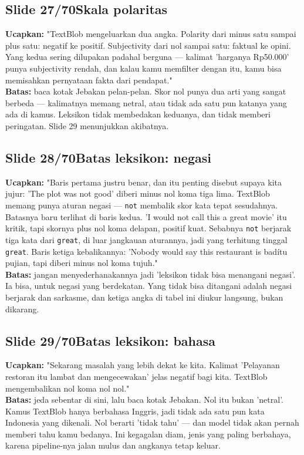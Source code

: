 \documentclass[11pt]{article}
\renewcommand{\framebox}[1]{\colorbox{acc!15}{\textcolor{acc}{\textbf{#1}}}}
\begin{document}
\subsection*{\framebox{Slide 27/70}\quad Skala polaritas}
\textbf{Ucapkan:} "TextBlob mengeluarkan dua angka. Polarity dari minus satu sampai plus satu: negatif ke positif. Subjectivity dari nol sampai satu: faktual ke opini. Yang kedua sering dilupakan padahal berguna — kalimat 'harganya Rp50.000' punya subjectivity rendah, dan kalau kamu memfilter dengan itu, kamu bisa memisahkan pernyataan fakta dari pendapat."\\[2pt]
\textbf{Batas:} baca kotak Jebakan pelan-pelan. Skor nol punya dua arti yang sangat berbeda — kalimatnya memang netral, atau tidak ada satu pun katanya yang ada di kamus. Leksikon tidak membedakan keduanya, dan tidak memberi peringatan. Slide 29 menunjukkan akibatnya.\\[2pt]

\subsection*{\framebox{Slide 28/70}\quad Batas leksikon: negasi}
\textbf{Ucapkan:} "Baris pertama justru benar, dan itu penting disebut supaya kita jujur: 'The plot was not good' diberi minus nol koma tiga lima. TextBlob memang punya aturan negasi — \texttt{not} membalik skor kata tepat sesudahnya. Batasnya baru terlihat di baris kedua. 'I would not call this a great movie' itu kritik, tapi skornya plus nol koma delapan, positif kuat. Sebabnya \texttt{not} berjarak tiga kata dari \texttt{great}, di luar jangkauan aturannya, jadi yang terhitung tinggal \texttt{great}. Baris ketiga kebalikannya: 'Nobody would say this restaurant is bad\' itu pujian, tapi diberi minus nol koma tujuh."\\[2pt]
\textbf{Batas:} jangan menyederhanakannya jadi 'leksikon tidak bisa menangani negasi'. Ia bisa, untuk negasi yang berdekatan. Yang tidak bisa ditangani adalah negasi berjarak dan sarkasme, dan ketiga angka di tabel ini diukur langsung, bukan dikarang.\\[2pt]

\subsection*{\framebox{Slide 29/70}\quad Batas leksikon: bahasa}
\textbf{Ucapkan:} "Sekarang masalah yang lebih dekat ke kita. Kalimat 'Pelayanan restoran itu lambat dan mengecewakan' jelas negatif bagi kita. TextBlob mengembalikan nol koma nol nol."\\[2pt]
\textbf{Batas:} jeda sebentar di sini, lalu baca kotak Jebakan. Nol itu bukan 'netral'. Kamus TextBlob hanya berbahasa Inggris, jadi tidak ada satu pun kata Indonesia yang dikenali. Nol berarti 'tidak tahu' — dan model tidak akan pernah memberi tahu kamu bedanya. Ini kegagalan diam, jenis yang paling berbahaya, karena pipeline-nya jalan mulus dan angkanya tetap keluar.\\[2pt]
\end{document}
